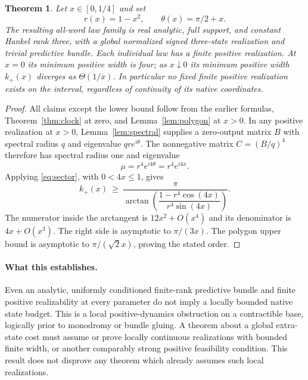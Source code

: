 \documentclass[11pt]{article}
\newtheorem{theorem}{Theorem}
\begin{document}
\begin{theorem}\label{thm:interval}
Let $x\in[0,1/4]$ and set
\[
 r(x)=1-x^2,\qquad \theta(x)=\pi/2+x.
\]
The resulting all-word law family is real analytic, full support, and constant Hankel rank three, with a global normalized signed three-state realization and trivial predictive bundle. Each individual law has a finite positive realization. At $x=0$ its minimum positive width is four; as $x\downarrow0$ its minimum positive width $k_+(x)$ diverges as $\Theta(1/x)$. In particular no fixed finite positive realization exists on the interval, regardless of continuity of its native coordinates.
\end{theorem}
\begin{proof}
All claims except the lower bound follow from the earlier formulas, Theorem~\ref{thm:clock} at zero, and Lemma~\ref{lem:polygon} at $x>0$. In any positive realization at $x>0$, Lemma~\ref{lem:spectral} supplies a zero-output matrix $B$ with spectral radius $q$ and eigenvalue $qr e^{i\theta}$. The nonnegative matrix $C=(B/q)^4$ therefore has spectral radius one and eigenvalue
\[
 \mu=r^4e^{i4\theta}=r^4e^{i4x}.
\]
Applying \eqref{eq:sector}, with $0<4x\leq1$, gives
\begin{equation}\label{eq:lower}
 k_+(x)\ \geq\
 \frac{\pi}{\arctan\!\left(\dfrac{1-r^4\cos(4x)}{r^4\sin(4x)}\right)}.
\end{equation}
The numerator inside the arctangent is $12x^2+O(x^4)$ and its denominator is $4x+O(x^3)$. The right side is asymptotic to $\pi/(3x)$. The polygon upper bound is asymptotic to $\pi/(\sqrt2 x)$, proving the stated order.
\end{proof}

\paragraph{What this establishes.}
Even an analytic, uniformly conditioned finite-rank predictive bundle and finite positive realizability at every parameter do not imply a locally bounded native state budget. This is a local positive-dynamics obstruction on a contractible base, logically prior to monodromy or bundle gluing. A theorem about a global extra-state cost must assume or prove locally continuous realizations with bounded finite width, or another comparably strong positive feasibility condition. This result does not disprove any theorem which already assumes such local realizations.
\end{document}
